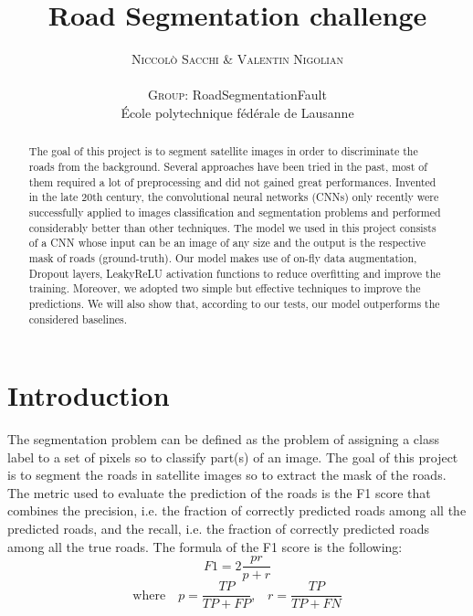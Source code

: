 \documentclass[10pt,conference,compsocconf]{IEEEtran}
\begin{document}
\pretitle{\begin{center}\Huge\bfseries} %
\posttitle{\end{center}} %
\title{Road Segmentation challenge}

\author{
	\textsc{Niccol\`{o} Sacchi \& Valentin Nigolian} \\ %
	\normalsize{} \\
	\textsc{Group:}
	\normalsize{RoadSegmentationFault}\\
	\normalsize \'{E}cole polytechnique f\'{e}d\'{e}rale de Lausanne
}

\maketitle

\begin{abstract}
  The goal of this project is to segment satellite images in order to discriminate the roads from the background. Several approaches have been tried in the past, most of them required a lot of preprocessing and did not gained great performances. Invented in the late 20th century, the convolutional neural networks (CNNs) only recently were successfully applied to images classification and segmentation problems and performed considerably better than other techniques. 
  The model we used in this project consists of a CNN whose input can be an image of any size and the output is the respective mask of roads (ground-truth). Our model makes use of on-fly data augmentation, Dropout layers, LeakyReLU activation functions to reduce overfitting and improve the training. Moreover, we adopted two simple but effective techniques to improve the predictions. We will also show that, according to our tests, our model outperforms the considered baselines. 
\end{abstract}

\section{Introduction}
The segmentation problem can be defined as the problem of assigning a class label to a set of pixels so to classify part(s) of an image. 
The goal of this project is to segment the roads in satellite images so to extract the mask of the roads. The metric used to evaluate the prediction of the roads is the F1 score that combines the precision, i.e. the fraction of correctly predicted roads among all the predicted roads, and the recall, i.e. the fraction of correctly predicted roads among all the true roads. The formula of the F1 score is the following:
$$F1=2\frac{pr}{p+r}$$ $$\textrm{where} \quad p=\frac{TP}{TP+FP} \textrm{,} \quad r=\frac{TP}{TP+FN}$$ 
\end{document}

